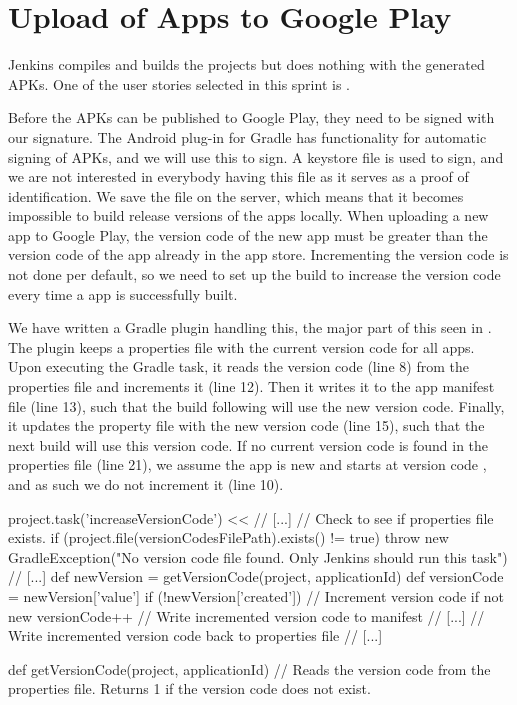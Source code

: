 \chapter{Upload of Apps to Google Play}\label{sec:upload_google_play}
Jenkins compiles and builds the projects but does nothing with the generated APKs. One of the user stories selected in this sprint is .

Before the APKs can be published to Google Play, they need to be signed with our signature. The Android plug-in for Gradle has functionality for automatic signing of APKs, and we will use this to sign. A keystore file is used to sign, and we are not interested in everybody having this file as it serves as a proof of identification. We save the file on the server, which means that it becomes impossible to build release versions of the apps locally.
When uploading a new app to Google Play, the version code of the new app must be greater than the version code of the app already in the app store. Incrementing the version code is not done per default, so we need to set up the build to increase the version code every time a app is successfully built. 

We have written a Gradle plugin handling this, the major part of this seen in . The plugin keeps a properties file with the current version code for all apps. Upon executing the  Gradle task, it reads the version code (line 8) from the properties file and increments it (line 12). Then it writes it to the app manifest file (line 13), such that the build following will use the new version code. Finally, it updates the property file with the new version code (line 15), such that the next build will use this version code. If no current version code is found in the properties file (line 21), we assume the app is new and starts at version code , and as such we do not increment it (line 10).
\begin{gradlecode}[caption=Part of our Gradle plugin for updating version code,label=lst:gradle_versioncode]
project.task('increaseVersionCode') << {
    // [...]
    // Check to see if properties file exists.
    if (project.file(versionCodesFilePath).exists() != true) {
        throw new GradleException("No version code file found. Only Jenkins should run this task")
    }
    // [...]
    def newVersion = getVersionCode(project, applicationId)
    def versionCode = newVersion['value']
    if (!newVersion['created']) {
        // Increment version code if not new
        versionCode++
        // Write incremented version code to manifest
        // [...]
        // Write incremented version code back to properties file
        // [...]
    }
}

def getVersionCode(project, applicationId) {
    // Reads the version code from the properties file. Returns 1 if the version code does not exist.
}
\end{gradlecode}

